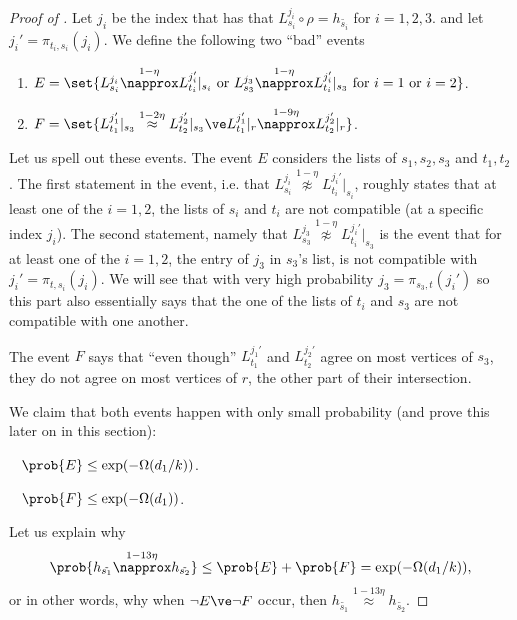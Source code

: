 \begin{proof}[Proof of ]
    Let \(j_i\) be the index that has that \(L_{s_i}^{j_i}\circ \rho = h_{\tilde{s_i}}\) for \(i=1,2,3\).  and let \(j_i' = \pi_{t_i,s_i}(j_i)\). We define the following two ``bad'' events
    \begin{enumerate}
        \item \(E = \set{L_{s_i}^{j_i} \overset{1-\eta}{\napprox} L_{t_i}^{j_i'}|_{s_i} \text{ or } L_{s_3}^{j_3} \overset{1-\eta}{\napprox} L_{t_i}^{j_i'}|_{s_3} \text{ for } i=1 \text{ or } i=2}\).
        \item \(F = \set{L_{t_1}^{j_1'}|_{s_3} \overset{1-2\eta}{\approx} L_{t_2}^{j_2'}|_{s_3} \ve L_{t_1}^{j_1'}|_{r} \overset{1-9\eta}{\napprox} L_{t_2}^{j_2'}|_{r}}\).
    \end{enumerate}
    Let us spell out these events. The event \(E\) considers the lists of \(s_1,s_2,s_3\) and \(t_1,t_2\). The first statement in the event, i.e. that \(L_{s_i}^{j_i} \overset{1-\eta}{\napprox} L_{t_i}^{j_i'}|_{s_i}\), roughly states that at least one of the \(i=1,2\), the lists of \(s_i\) and \(t_i\) are not compatible (at a specific index \(j_i\)). The second statement, namely that \(L_{s_3}^{j_3} \overset{1-\eta}{\napprox} L_{t_i}^{j_i'}|_{s_3}\) is the event that for at least one of the \(i=1,2\), the entry of \(j_3\) in \(s_3\)'s list, is not compatible with \(j_i'=\pi_{t,s_i}(j_i)\). We will see that with very high probability \(j_3 = \pi_{s_3,t}(j_i')\) so this part also essentially says that the one of the lists of \(t_i\) and \(s_3\) are not compatible with one another.
    
    The event \(F\) says that ``even though'' \(L_{t_1}^{j_1'}\) and \( L_{t_2}^{j_2'}\) agree on most vertices of \(s_3\), they do not agree on most vertices of \(r\), the other part of their intersection.

    We claim that both events happen with only small probability (and prove this later on in this section):
    \begin{claim} \label{claim:E-is-small}~ 
        \(\prob{E} \leq \exp(-\Omega(d_1/k))\).
    \end{claim}
    \begin{claim} \label{claim:F-is-small}~ 
        \(\prob{F} \leq \exp(-\Omega(d_1))\).
    \end{claim}
    Let us explain why
    \begin{equation}
        \prob{h_{\tilde{s_1}} \overset{1-13\eta}{\napprox} h_{\tilde{s_2}}} \leq \prob{E} + \prob{F} = \exp(-\Omega(d_1/k)),
    \end{equation}
    or in other words, why when \(\neg E \ve \neg F\) occur, then \(h_{\tilde{s_1}} \overset{1-13\eta}{\approx} h_{\tilde{s_2}}\).
    

\end{proof}

